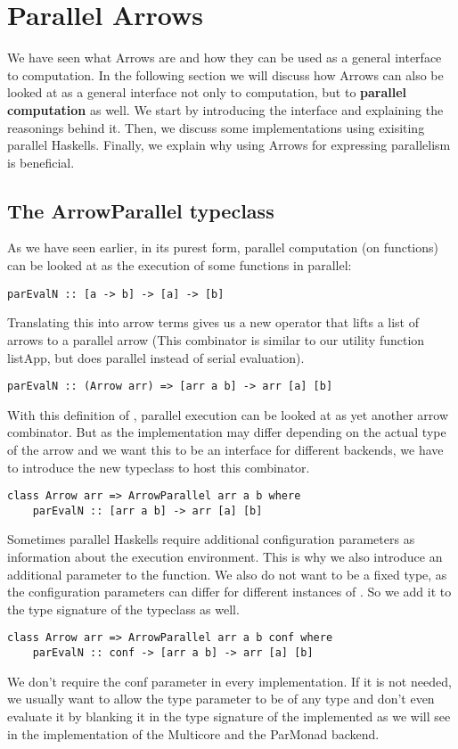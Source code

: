 \section{Parallel Arrows}
We have seen what Arrows are and how they can be used as a general interface to computation. In the following section we will discuss how Arrows can also be looked at as a general interface not only to computation, but to \textbf{parallel computation} as well. We start by introducing the interface and explaining the reasonings behind it. Then, we discuss some implementations using exisiting parallel Haskells. Finally, we explain why using Arrows for expressing parallelism is beneficial.
\subsection{The ArrowParallel typeclass}
As we have seen earlier, in its purest form, parallel computation (on functions) can be looked at as the execution of some functions  in parallel:
\begin{lstlisting}[frame=htrbl]
parEvalN :: [a -> b] -> [a] -> [b]
\end{lstlisting}
Translating this into arrow terms gives us a new operator  that lifts a list of arrows \code{[arr a b]} to a parallel arrow  (This combinator is similar to our utility function listApp, but does parallel instead of serial evaluation).
\begin{lstlisting}[frame=htrbl]
parEvalN :: (Arrow arr) => [arr a b] -> arr [a] [b]
\end{lstlisting}
With this definition of , parallel execution can be looked at as yet another arrow combinator. But as the implementation may differ depending on the actual type of the arrow  and we want this to be an interface for different backends, we have to introduce the new typeclass  to host this combinator.
\begin{lstlisting}[frame=htrbl]
class Arrow arr => ArrowParallel arr a b where
	parEvalN :: [arr a b] -> arr [a] [b]
\end{lstlisting}
Sometimes parallel Haskells require additional configuration parameters as information about the execution environment. This is why we also introduce an additional  parameter to the function. We also do not want  to be a fixed type, as the configuration parameters can differ for different instances of . So we add it to the type signature of the typeclass as well.
\begin{lstlisting}[frame=htrbl]
class Arrow arr => ArrowParallel arr a b conf where
	parEvalN :: conf -> [arr a b] -> arr [a] [b]
\end{lstlisting}
We don't require the conf parameter in every implementation. If it is not needed, we usually want to allow the  type parameter to be of any type and don't even evaluate it by blanking it in the type signature of the implemented  as we will see in the implementation of the Multicore and the ParMonad backend.

